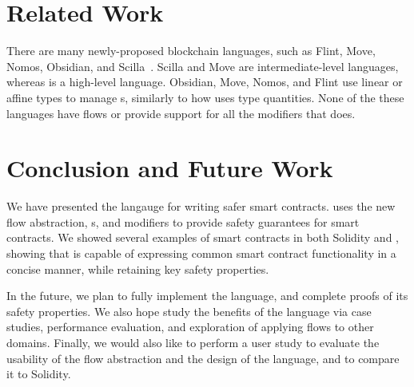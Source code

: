\documentclass[nonacm, dvipsnames, usenames, sigconf]{acmart}
\begin{document}

\section{Related Work}
There are many newly-proposed blockchain languages, such as Flint, Move, Nomos, Obsidian, and Scilla~\cite{schrans2018flint, blackshear2019move, das2019nomos, coblenz2019obsidian, sergey2018scilla}.
Scilla and Move are intermediate-level languages, whereas \langName is a high-level language.
Obsidian, Move, Nomos, and Flint use linear or affine types to manage \assetTxt{}s, similarly to how \langName uses type quantities.
None of the these languages have flows or provide support for all the modifiers that \langName does.

\section{Conclusion and Future Work}

We have presented the \langName langauge for writing safer smart contracts.
\langName uses the new flow abstraction, \assetTxt{}s, and modifiers to provide safety guarantees for smart contracts.
We showed several examples of smart contracts in both Solidity and \langName, showing that \langName is capable of expressing common smart contract functionality in a concise manner, while retaining key safety properties.

In the future, we plan to fully implement the \langName language, and complete proofs of its safety properties.
We also hope study the benefits of the language via case studies, performance evaluation, and exploration of applying flows to other domains.
Finally, we would also like to perform a user study to evaluate the usability of the flow abstraction and the design of the language, and to compare it to Solidity.



\end{document}
